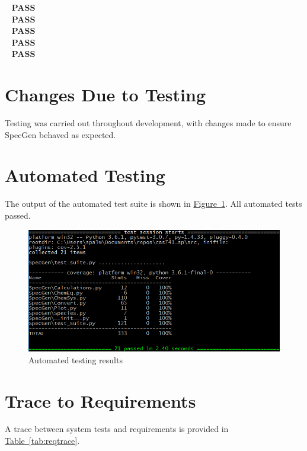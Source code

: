 \documentclass[12pt, titlepage]{article}
\newcommand{\progname}{SpecGen}
\newcounter{testnum} %
\begin{document}
~{\color{Green} \bf PASS}\\
~{\color{Green} \bf PASS}\\
~{\color{Green} \bf PASS}\\
~{\color{Green} \bf PASS}\\
~{\color{Green} \bf PASS}

\section{Changes Due to Testing}
Testing was carried out throughout development, with changes made
to ensure \progname{} behaved as expected.

\section{Automated Testing}
The output of the automated test suite is shown in \hyperref[fig:results]{Figure~\ref*{fig:results}}.
All automated tests passed.

\begin{figure}[!h]
\centering
\includegraphics[width=\textwidth]{results}
\caption{Automated testing results} \label{fig:results}
\end{figure}
		
\section{Trace to Requirements}
A trace between system tests and requirements is provided in 
\hyperref[tab:reqtrace]{Table~\ref*{tab:reqtrace}}.
\end{document}
